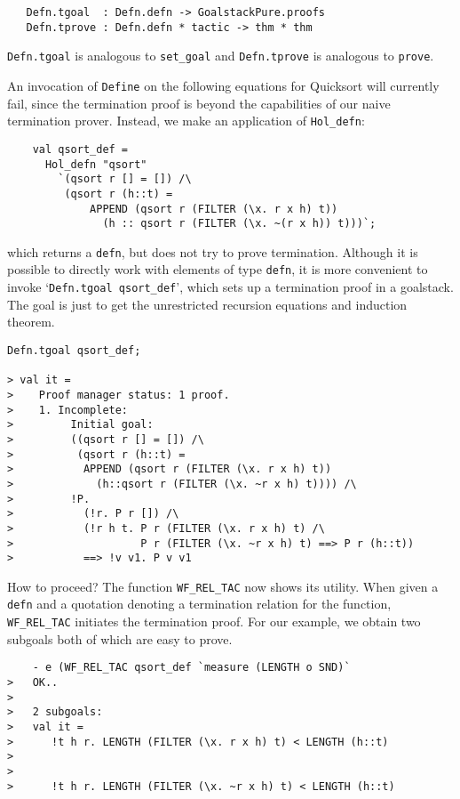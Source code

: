\begin{verbatim}
   Defn.tgoal  : Defn.defn -> GoalstackPure.proofs
   Defn.tprove : Defn.defn * tactic -> thm * thm
\end{verbatim}

{\small\verb+Defn.tgoal+} is analogous to {\small\verb+set_goal+} and
{\small\verb+Defn.tprove+} is analogous to {\small\verb+prove+}.

 An invocation of {\small\verb+Define+} on
the following equations for Quicksort will currently fail, since the
termination proof is beyond the capabilities of our naive termination
prover. Instead, we make an application of {\small\verb+Hol_defn+}:

\begin{verbatim}
    val qsort_def =
      Hol_defn "qsort"
        `(qsort r [] = []) /\
         (qsort r (h::t) =
             APPEND (qsort r (FILTER (\x. r x h) t))
               (h :: qsort r (FILTER (\x. ~(r x h)) t)))`;
\end{verbatim}
which returns a {\small\verb+defn+}, but does not try to prove
termination. Although it is possible to directly work with elements of
type {\small\verb+defn+}, it is more convenient to invoke
`{\small\tt Defn.tgoal qsort\_def}', which sets up a termination
proof in a goalstack. The goal is just to get the unrestricted recursion
equations and induction theorem.

\begin{verbatim}
Defn.tgoal qsort_def;

> val it =
>    Proof manager status: 1 proof.
>    1. Incomplete:
>         Initial goal:
>         ((qsort r [] = []) /\
>          (qsort r (h::t) =
>           APPEND (qsort r (FILTER (\x. r x h) t))
>             (h::qsort r (FILTER (\x. ~r x h) t)))) /\
>         !P.
>           (!r. P r []) /\
>           (!r h t. P r (FILTER (\x. r x h) t) /\
>                    P r (FILTER (\x. ~r x h) t) ==> P r (h::t))
>           ==> !v v1. P v v1
\end{verbatim}

How to proceed? The function {\small\verb+WF_REL_TAC+} now shows its
utility. When given a {\small\verb+defn+} and a quotation denoting a
termination relation for the function, {\small\verb+WF_REL_TAC+}
initiates the termination proof. For our example, we obtain two subgoals
both of which are easy to prove.

\begin{verbatim}
    - e (WF_REL_TAC qsort_def `measure (LENGTH o SND)`
>   OK..
>
>   2 subgoals:
>   val it =
>      !t h r. LENGTH (FILTER (\x. r x h) t) < LENGTH (h::t)
>
>
>      !t h r. LENGTH (FILTER (\x. ~r x h) t) < LENGTH (h::t)
\end{verbatim}


